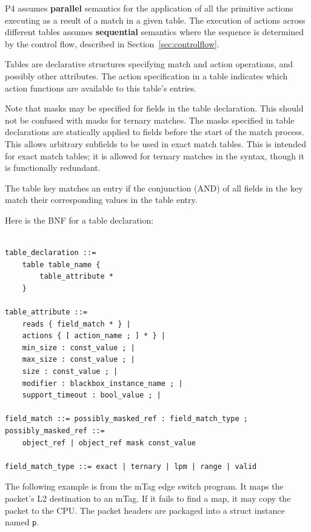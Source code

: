 \documentclass[12pt]{article}
\begin{document}
P4 assumes \textbf{parallel} semantics for the application of all the 
primitive actions executing as a result of a match in a given table. The
execution of actions across different tables assumes \textbf{sequential} 
semantics where the sequence is determined by the control flow, described 
in Section~\ref{sec:controlflow}.


Tables are declarative structures specifying match and action operations, and
possibly other attributes. The action specification in a table indicates which
action functions are available to this table's entries.

Note that masks may be specified for fields in the table declaration. This 
should not be confused with masks for ternary matches. The masks specified 
in table declarations are statically applied to fields before the start of 
the match process. This allows arbitrary subfields to be used in exact match 
tables. This is intended for exact match tables; it is allowed for ternary 
matches in the syntax, though it is functionally redundant.

The table key matches an entry if the conjunction (AND) of all fields in
the key match their corresponding values in the table entry.

Here is the BNF for a table declaration:

\begin{lstlisting}[style=BNFstyle]

table_declaration ::=
    table table_name {
        table_attribute *
    }

table_attribute ::=
    reads { field_match * } |
    actions { [ action_name ; ] * } |
    min_size : const_value ; |
    max_size : const_value ; |
    size : const_value ; |
    modifier : blackbox_instance_name ; |
    support_timeout : bool_value ; |

field_match ::= possibly_masked_ref : field_match_type ;
possibly_masked_ref ::= 
    object_ref | object_ref mask const_value

field_match_type ::= exact | ternary | lpm | range | valid

\end{lstlisting}

The following example is from the mTag edge switch program.  It maps the
packet's L2 destination to an mTag. If it fails to find a map, it may copy the
packet to the CPU. The packet headers are packaged into a struct instance named
\texttt{p}.
\end{document}
